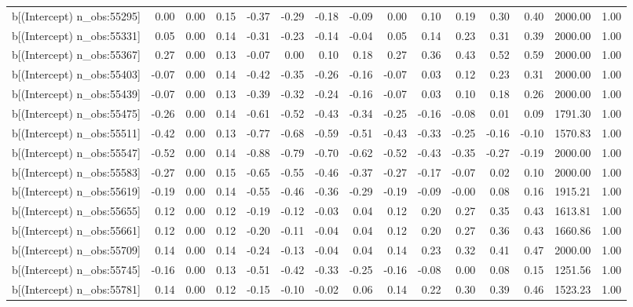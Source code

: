 \begin{table}[ht]
\begin{tabular}{rrrrrrrrrrrrrrr}
  b[(Intercept) n\_obs:55295] & 0.00 & 0.00 & 0.15 & -0.37 & -0.29 & -0.18 & -0.09 & 0.00 & 0.10 & 0.19 & 0.30 & 0.40 & 2000.00 & 1.00 \\ 
  b[(Intercept) n\_obs:55331] & 0.05 & 0.00 & 0.14 & -0.31 & -0.23 & -0.14 & -0.04 & 0.05 & 0.14 & 0.23 & 0.31 & 0.39 & 2000.00 & 1.00 \\ 
  b[(Intercept) n\_obs:55367] & 0.27 & 0.00 & 0.13 & -0.07 & 0.00 & 0.10 & 0.18 & 0.27 & 0.36 & 0.43 & 0.52 & 0.59 & 2000.00 & 1.00 \\ 
  b[(Intercept) n\_obs:55403] & -0.07 & 0.00 & 0.14 & -0.42 & -0.35 & -0.26 & -0.16 & -0.07 & 0.03 & 0.12 & 0.23 & 0.31 & 2000.00 & 1.00 \\ 
  b[(Intercept) n\_obs:55439] & -0.07 & 0.00 & 0.13 & -0.39 & -0.32 & -0.24 & -0.16 & -0.07 & 0.03 & 0.10 & 0.18 & 0.26 & 2000.00 & 1.00 \\ 
  b[(Intercept) n\_obs:55475] & -0.26 & 0.00 & 0.14 & -0.61 & -0.52 & -0.43 & -0.34 & -0.25 & -0.16 & -0.08 & 0.01 & 0.09 & 1791.30 & 1.00 \\ 
  b[(Intercept) n\_obs:55511] & -0.42 & 0.00 & 0.13 & -0.77 & -0.68 & -0.59 & -0.51 & -0.43 & -0.33 & -0.25 & -0.16 & -0.10 & 1570.83 & 1.00 \\ 
  b[(Intercept) n\_obs:55547] & -0.52 & 0.00 & 0.14 & -0.88 & -0.79 & -0.70 & -0.62 & -0.52 & -0.43 & -0.35 & -0.27 & -0.19 & 2000.00 & 1.00 \\ 
  b[(Intercept) n\_obs:55583] & -0.27 & 0.00 & 0.15 & -0.65 & -0.55 & -0.46 & -0.37 & -0.27 & -0.17 & -0.07 & 0.02 & 0.10 & 2000.00 & 1.00 \\ 
  b[(Intercept) n\_obs:55619] & -0.19 & 0.00 & 0.14 & -0.55 & -0.46 & -0.36 & -0.29 & -0.19 & -0.09 & -0.00 & 0.08 & 0.16 & 1915.21 & 1.00 \\ 
  b[(Intercept) n\_obs:55655] & 0.12 & 0.00 & 0.12 & -0.19 & -0.12 & -0.03 & 0.04 & 0.12 & 0.20 & 0.27 & 0.35 & 0.43 & 1613.81 & 1.00 \\ 
  b[(Intercept) n\_obs:55661] & 0.12 & 0.00 & 0.12 & -0.20 & -0.11 & -0.04 & 0.04 & 0.12 & 0.20 & 0.27 & 0.36 & 0.43 & 1660.86 & 1.00 \\ 
  b[(Intercept) n\_obs:55709] & 0.14 & 0.00 & 0.14 & -0.24 & -0.13 & -0.04 & 0.04 & 0.14 & 0.23 & 0.32 & 0.41 & 0.47 & 2000.00 & 1.00 \\ 
  b[(Intercept) n\_obs:55745] & -0.16 & 0.00 & 0.13 & -0.51 & -0.42 & -0.33 & -0.25 & -0.16 & -0.08 & 0.00 & 0.08 & 0.15 & 1251.56 & 1.00 \\ 
  b[(Intercept) n\_obs:55781] & 0.14 & 0.00 & 0.12 & -0.15 & -0.10 & -0.02 & 0.06 & 0.14 & 0.22 & 0.30 & 0.39 & 0.46 & 1523.23 & 1.00 \\ 

\end{tabular}
\end{table}
